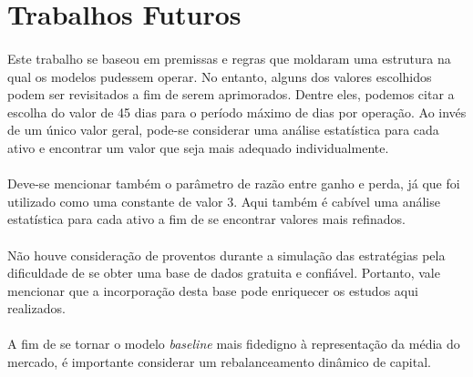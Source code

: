 \FloatBarrier
\section{Trabalhos Futuros}



\paragraph{} Este trabalho se baseou em premissas e regras que moldaram uma estrutura na qual os modelos pudessem operar. No entanto, alguns dos valores escolhidos podem ser revisitados a fim de serem aprimorados. Dentre eles, podemos citar a escolha do valor de 45 dias para o período máximo de dias por operação. Ao invés de um único valor geral, pode-se considerar uma análise estatística para cada ativo e encontrar um valor que seja mais adequado individualmente.

\paragraph{} Deve-se mencionar também o parâmetro de razão entre ganho e perda, já que foi utilizado como uma constante de valor 3. Aqui também é cabível uma análise estatística para cada ativo a fim de se encontrar valores mais refinados.

\paragraph{} Não houve consideração de proventos durante a simulação das estratégias pela dificuldade de se obter uma base de dados gratuita e confiável. Portanto, vale mencionar que a incorporação desta base pode enriquecer os estudos aqui realizados.

\paragraph{} A fim de se tornar o modelo \textit{baseline} mais fidedigno à representação da média do mercado, é importante considerar um rebalanceamento dinâmico de capital.